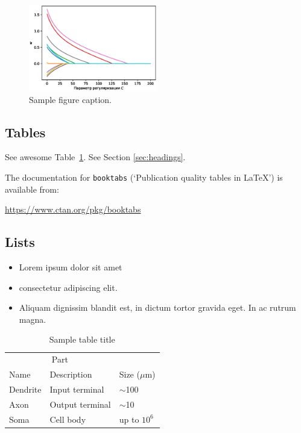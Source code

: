 \documentclass{article}
\begin{document}
\begin{figure}
	\centering
	\includegraphics[width=0.5\textwidth]{../figures/log_reg_cs_exp.eps}
	\caption{Sample figure caption.}
	\label{fig:fig1}
\end{figure}

\subsection{Tables}
See awesome Table~\ref{tab:table}.
See Section \ref{sec:headings}.

The documentation for \verb+booktabs+ (`Publication quality tables in LaTeX') is available from:
\begin{center}
	\url{https://www.ctan.org/pkg/booktabs}
\end{center}




\subsection{Lists}
\begin{itemize}
	\item Lorem ipsum dolor sit amet
	\item consectetur adipiscing elit.
	\item Aliquam dignissim blandit est, in dictum tortor gravida eget. In ac rutrum magna.
\end{itemize}

\begin{table}
	\caption{Sample table title}
	\centering
	\begin{tabular}{lll}
		\toprule
		\multicolumn{2}{c}{Part}                   \\
		\cmidrule(r){1-2}
		Name     & Description     & Size ($\mu$m) \\
		\midrule
		Dendrite & Input terminal  & $\sim$100     \\
		Axon     & Output terminal & $\sim$10      \\
		Soma     & Cell body       & up to $10^6$  \\
		\bottomrule
	\end{tabular}
	\label{tab:table}
\end{table}



\end{document}
